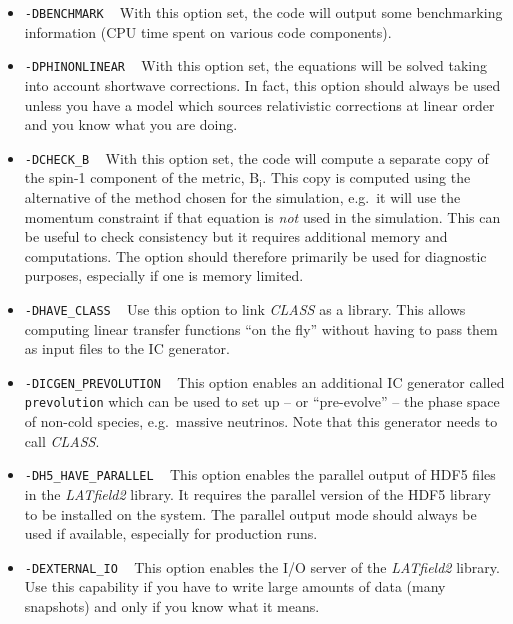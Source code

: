 \documentclass[a4paper,10pt]{article}
\begin{document}
\begin{itemize}
 \item[] \hspace{-25pt}\texttt{-DBENCHMARK} ~ With this option set, the code will output some benchmarking information (CPU time spent on various code components).
 \item[] \hspace{-25pt}\texttt{-DPHINONLINEAR} ~ With this option set, the equations will be solved taking into account shortwave corrections. In fact, this option should always be used unless you have a model which sources relativistic corrections at linear order and you know what you are doing.
 \item[] \hspace{-25pt}\texttt{-DCHECK\_B} ~ With this option set, the code will compute a separate copy of the spin-1 component of the
 metric, B$_\mathsf{i}$. This copy is computed using the alternative of the method chosen for the simulation, e.g.\ it will use the
 momentum constraint if that equation is \textit{not} used in the simulation. This can be useful to check consistency but it requires
 additional memory and computations. The option should therefore primarily be used for diagnostic purposes, especially if one is memory limited.
 \item[] \hspace{-25pt}\texttt{-DHAVE\_CLASS} ~ Use this option to link \textit{CLASS} as a library. This allows computing linear transfer functions ``on the fly'' without having to pass them as input files to the IC generator.
 \item[] \hspace{-25pt}\texttt{-DICGEN\_PREVOLUTION} ~ This option enables an additional IC generator called \texttt{prevolution} which can 
 be used to set up -- or ``pre-evolve'' -- the phase space of non-cold species, e.g.\ massive neutrinos. Note that this generator needs to call \textit{CLASS}.
 \item[] \hspace{-25pt}\texttt{-DH5\_HAVE\_PARALLEL} ~ This option enables the parallel output of HDF5 files in the \textit{LATfield2} 
 library. It requires the parallel version of the HDF5 library to be installed on the system. The parallel output mode should always be used if available, especially for production runs.
 \item[] \hspace{-25pt}\texttt{-DEXTERNAL\_IO} ~ This option enables the I/O server of the \textit{LATfield2} library. Use this capability if you have to write large amounts of data (many snapshots) and only if you know what it means.
\end{itemize}
\end{document}
